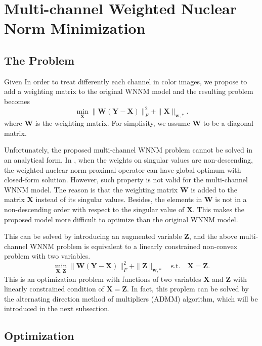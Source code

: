 \documentclass[10pt,twocolumn,letterpaper]{article}
\begin{document}
\section{Multi-channel Weighted Nuclear Norm Minimization}

\subsection{The Problem}
Given 
In order to treat differently each channel in color images, we propose to add a weighting matrix to the original WNNM model and the resulting problem becomes
\begin{equation}
\min_{\mathbf{X}}\|\mathbf{W}(\mathbf{Y}-\mathbf{X})\|_{F}^{2}
+ 
\|\mathbf{X}\|_{\bm{w},*}.
\end{equation}
where $\mathbf{W}$ is the weighting matrix. For simplisity, we assume $\mathbf{W}$ to be a diagonal matrix. 

Unfortunately, the proposed multi-channel WNNM problem cannot be solved in an analytical form. In \cite{wnnmijcv}, when the weights on singular values are non-descending, the weighted nuclear norm proximal operator can have global optimum with closed-form solution. However, such property is not valid for the multi-channel WNNM model. The reason is that the weighting matrix $\mathbf{W}$ is added to the matrix $\mathbf{X}$ instead of its singular values. Besides, the elements in $\mathbf{W}$ is not in a non-descending order with respect to the singular value of $\mathbf{X}$. This makes the proposed model more difficult to optimize than the original WNNM model. 

This can be solved by introducing an augmented variable $\mathbf{Z}$, and the above multi-channel WNNM problem is equivalent to a linearly constrained non-convex problem with two variables.
\begin{equation}
\min_{\mathbf{X},\mathbf{Z}}\|\mathbf{W}(\mathbf{Y}-\mathbf{X})\|_{F}^{2}
+
\|\mathbf{Z}\|_{\bm{w},*}
\quad
\text{s.t.}
\quad
\mathbf{X}=\mathbf{Z}.
\end{equation}
This is an optimization problem with functions of two variables $\mathbf{X}$ and $\mathbf{Z}$ with linearly constrained condition of $\mathbf{X}=\mathbf{Z}$. In fact, this proplem can be solved by the alternating direction method of multipliers (ADMM) algorithm, which will be introduced in the next subsection.

\subsection{Optimization}
\end{document}
